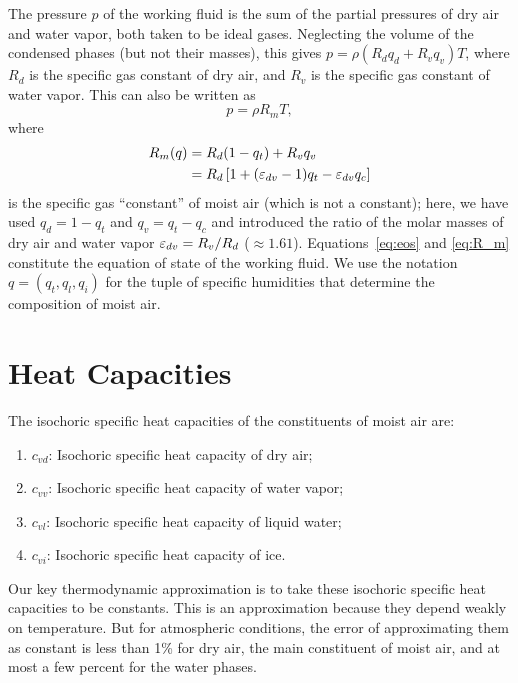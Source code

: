 \documentclass{report}
\begin{document}
The pressure $p$ of the working fluid is the sum of the partial pressures of dry air and water vapor, both taken to be ideal gases. Neglecting the volume of the condensed phases (but not their masses), this gives $p = \rho (R_d q_d + R_v q_v) T$, where $R_d$ is the specific gas constant of dry air, and $R_v$ is the specific gas constant of water vapor. This can also be written as
\begin{equation}
    p = \rho R_m T,
\label{eq:eos}
\end{equation}
where
\begin{equation}
\begin{split}
    R_m(q) & = R_d (1 - q_t) + R_v q_v \\
        & = R_d \left[1 + (\varepsilon_{dv}-1)q_t - \varepsilon_{dv} q_c\right]
\label{eq:R_m}
\end{split}
\end{equation}
is the specific gas ``constant'' of moist air (which is not a constant); here, we have used $q_d = 1-q_t$ and $q_v = q_t - q_c$ and introduced the ratio of the molar masses of dry air and water vapor $\varepsilon_{dv} = R_v/R_d$ ($\approx 1.61$). Equations~\eqref{eq:eos} and \eqref{eq:R_m} constitute the equation of state of the working fluid. We use the notation $q=(q_t, q_l, q_i)$ for the tuple of specific humidities that determine the composition of moist air.

\section{Heat Capacities}\label{s:heat_capacities}

The isochoric specific heat capacities of the constituents of moist air are:
\begin{enumerate}
    \item $c_{vd}$: Isochoric specific heat capacity of dry air;
    \item $c_{vv}$: Isochoric specific heat capacity of water vapor;
    \item $c_{vl}$: Isochoric specific heat capacity of liquid water;
    \item $c_{vi}$: Isochoric specific heat capacity of ice.
\end{enumerate}
Our key thermodynamic approximation is to take these isochoric specific heat capacities to be constants. This is an approximation because they depend weakly on temperature. But for atmospheric conditions, the error of approximating them as constant is less than 1\% for dry air, the main constituent of moist air, and at most a few percent for the water phases.
\end{document}
